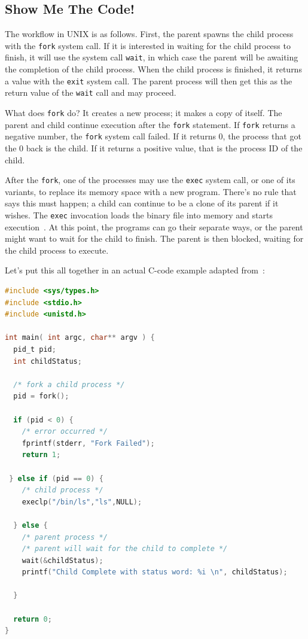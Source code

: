 \subsection*{Show Me The Code!}

The workflow in UNIX is as follows. First, the parent spawns the child process with the \texttt{fork} system call. If it is interested in waiting for the child process to finish, it will use the system call \texttt{wait}, in which case the parent will be awaiting the completion of the child process. When the child process is finished, it returns a value with the \texttt{exit} system call. The parent process will then get this as the return value of the \texttt{wait} call and may proceed.

What does \texttt{fork} do? It creates a new process; it makes a copy of itself. The parent and child continue execution after the \texttt{fork} statement. If \texttt{fork} returns a negative number, the \texttt{fork} system call failed. If it returns 0, the process that got the 0 back is the child. If it returns a positive value, that is the process ID of the child.

After the \texttt{fork}, one of the processes may use the \texttt{exec} system call, or one of its variants, to replace its memory space with a new program. There's no rule that says this must happen; a child can continue to be a clone of its parent if it wishes. The \texttt{exec} invocation loads the binary file into memory and starts execution~\cite{osc}. At this point, the programs can go their separate ways, or the parent might want to wait for the child to finish. The parent is then blocked, waiting for the child process to execute.

Let's put this all together in an actual C-code example adapted from~\cite{osc}:

\begin{lstlisting}[language=C]
#include <sys/types.h>
#include <stdio.h> 
#include <unistd.h>

int main( int argc, char** argv ) {
  pid_t pid;
  int childStatus;

  /* fork a child process */
  pid = fork();
  
  if (pid < 0) { 
    /* error occurred */ 
    fprintf(stderr, "Fork Failed"); 
    return 1;
  
 } else if (pid == 0) {    
    /* child process */
    execlp("/bin/ls","ls",NULL);
    
  } else {    
    /* parent process */
    /* parent will wait for the child to complete */
    wait(&childStatus);
    printf("Child Complete with status word: %i \n", childStatus);
    
  }
    
  return 0;
}
\end{lstlisting}

